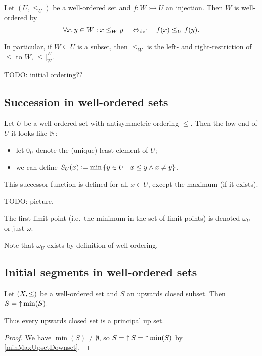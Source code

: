 \begin{lemma} \label{wellOrderingSubsets}
Let $(U,\leq_U)$ be a well-ordered set and $f: W \rightarrowtail U$ an injection. Then $W$ is well-ordered by
\[ \forall x,y\in W: x\leq_W y \quad\Leftrightarrow_{\text{def}}\quad f(x) \leq_U f(y). \]


In particular, if $W\subseteq U$ is a subset, then $\leq_W$ is the left- and right-restriction of $\leq$ to $W$, $\leq|_W^W$.
\end{lemma}
TODO: initial ordering??



\subsection{Succession in well-ordered sets}
Let $U$ be a well-ordered set with antisymmetric ordering $\leq$. Then the low end of $U$ it looks like $\mathbb{N}$:
\begin{itemize}
\item let $0_U$ denote the (unique) least element of $U$;
\item we can define $S_U(x) \defeq \min\setbuilder{y\in U}{x\leq y \land x\neq y}$.
\end{itemize}
This successor function is defined for all $x\in U$, except the maximum (if it exists).

TODO: picture.

\begin{definition}
The first limit point (i.e.\ the minimum in the set of limit points) is denoted $\omega_U$ or just $\omega$.
\end{definition}
Note that $\omega_U$ exists by definition of well-ordering.

\subsection{Initial segments in well-ordered sets}
\begin{proposition}
Let $\sSet{X,\leq}$ be a well-ordered set and $S$ an upwards closed subset. Then $S = \operatorname{\uparrow}\min(S)$.

Thus every upwards closed set is a principal up set.
\end{proposition}
\begin{proof}
We have $\min(S) \neq\emptyset$, so $S = \operatorname{\uparrow} S = \operatorname{\uparrow}\min(S)$ by \ref{minMaxUpsetDownset}.
\end{proof}

